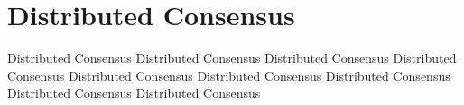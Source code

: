 \documentclass[dareport.tex]{subfiles}
\begin{document}
\section{Distributed Consensus}
Distributed Consensus Distributed Consensus
Distributed Consensus
Distributed Consensus
Distributed Consensus
Distributed Consensus
Distributed Consensus
Distributed Consensus
Distributed Consensus
\end{document}

